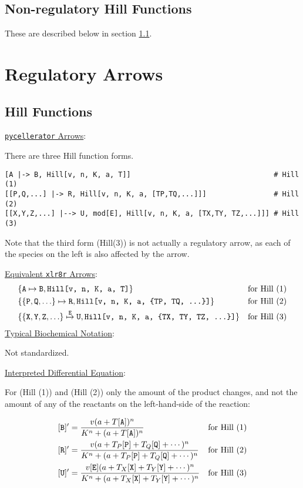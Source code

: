  
\subsection{Non-regulatory Hill Functions}
These are described below in section \ref{section:Hill}.

\section{Regulatory Arrows}
\subsection{Hill Functions}
\label{section:Hill}
\underline{{\tt pycellerator} Arrows}:

There are three Hill function forms. 

\begin{lstlisting}
[A |-> B, Hill[v, n, K, a, T]]                                  # Hill (1)
[[P,Q,...] |-> R, Hill[v, n, K, a, [TP,TQ,...]]]                # Hill (2)
[[X,Y,Z,...] |--> U, mod[E], Hill[v, n, K, a, [TX,TY, TZ,...]]] # Hill (3)
\end{lstlisting}

Note that the third form (Hill(3)) is not actually a regulatory arrow, as each of the species on the left is also affected by the arrow. 

\underline{Equivalent {\tt xlr8r} Arrows}: 
\begin{align*}
& \{{\tt A} \mapsto {\tt B}, \text{\tt Hill[v, n, K, a, T]}\} & \text{for Hill (1)}\\
& \{\{{\tt P, Q, \dots}\} \mapsto {\tt R}, \text{\tt Hill[v, n, K, a, \{TP, TQ, \dots\}]}\} & \text{for Hill (2)}\\
& \{\{{\tt X, Y, Z, \dots }\} \overset{\tt E}{\mapsto} {\tt U}, \text{\tt Hill[v, n, K, a, \{TX, TY, TZ, \dots\}]}\} & \text{for Hill (3)}\\
\end{align*}
\underline{Typical Biochemical Notation}: 

Not standardized.

\underline{Interpreted Differential Equation}:

For (Hill (1)) and (Hill (2)) only the amount of the product changes, and not the amount of any of the reactants on the left-hand-side of the reaction:

\begin{align}
&{\tt [B]'}= \dfrac{v  ( a + T {\tt [A]} )^n}{K^n + (a+T{\tt [A]})^n} & \text{for Hill (1)}\\
&{\tt [R]'}= \dfrac{v  (a + T_P{\tt [P]} + T_Q{\tt [Q]} + \cdots)^n}{K^n + (a + T_P{\tt [P]} + T_Q{\tt [Q]} + \cdots)^n} & \text{for Hill (2)}\\
&{\tt [U]'}= \dfrac{v {\tt [E]} ( a + T_X{\tt [X]} + T_Y{\tt [Y]}+ \cdots )^n}{K^n + (a + T_X{\tt [X]} + T_Y{\tt [Y]} + \cdots)^n} & \text{for Hill (3)}
\end{align}

